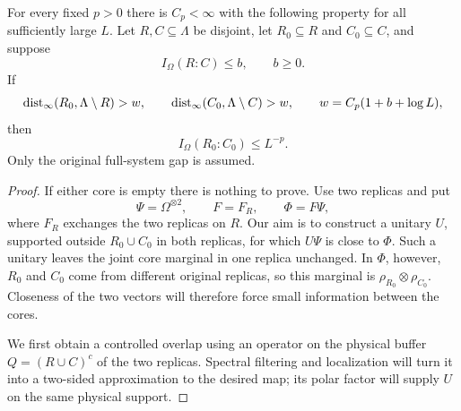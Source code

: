 \begin{lemma}
\label{lem:reset}
For every fixed $p>0$ there is $C_p<\infty$ with the following
property for all sufficiently large $L$.  Let $R,C\subseteq\Lambda$
be disjoint, let $R_0\subseteq R$ and $C_0\subseteq C$, and suppose
\[
 I_\Omega(R:C)\le b,\qquad b\ge0.
\]
If
\begin{equation}
 \operatorname{dist}_\infty(R_0,\Lambda\setminus R)>w,\qquad
 \operatorname{dist}_\infty(C_0,\Lambda\setminus C)>w,
 \qquad w=C_p(1+b+\log L),
 \label{eq:info-reset-width}
\end{equation}
then
\[
 I_\Omega(R_0:C_0)\le L^{-p}.
\]
Only the original full-system gap is assumed.
\end{lemma}

\begin{proof}
If either core is empty there is nothing to prove.  Use two replicas
and put
\[
 \Psi=\Omega^{\otimes2},\qquad F=F_R,\qquad \Phi=F\Psi,
\]
where $F_R$ exchanges the two replicas on $R$.  Our aim is to construct
a unitary $U$, supported outside $R_0\cup C_0$ in both replicas, for
which $U\Psi$ is close to $\Phi$.  Such a unitary leaves the joint core marginal in one replica
unchanged.  In $\Phi$, however, $R_0$ and $C_0$ come from different
original replicas, so this marginal is $\rho_{R_0}\otimes\rho_{C_0}$.
Closeness of the two vectors will therefore force small information
between the cores.

We first obtain a controlled overlap using an operator on the physical
buffer $Q=(R\cup C)^c$ of the two replicas.  Spectral filtering and
localization will turn it into a two-sided approximation to the desired
map; its polar factor will supply $U$ on the same physical support.


\end{proof}
